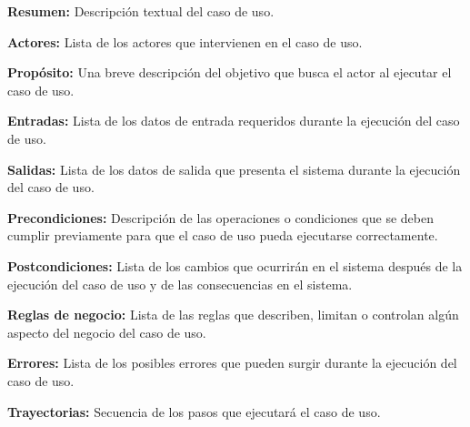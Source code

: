 \documentclass[10pt]{book}
\begin{document}
     \begin{objetivos}
	\item {\bf Resumen:} Descripción textual del caso de uso.
	\item {\bf Actores:} Lista de los actores que intervienen en el caso de uso.
	\item {\bf Propósito:} Una breve descripción del objetivo que busca el actor al ejecutar el caso de uso.
	\item {\bf Entradas:} Lista de los datos de entrada requeridos durante la ejecución del caso de uso.
	\item {\bf Salidas:} Lista de los datos de salida que presenta el sistema durante la ejecución del caso de uso.
	\item {\bf Precondiciones:} Descripción de las operaciones o condiciones que se deben cumplir previamente para que el caso de uso pueda ejecutarse correctamente.
	\item {\bf Postcondiciones:} Lista de los cambios que ocurrirán en el sistema después de la ejecución del caso de uso y de las consecuencias en el sistema.
	\item {\bf Reglas de negocio:} Lista de las reglas que describen, limitan o controlan algún aspecto del negocio del caso de uso.
	\item {\bf Errores:} Lista de los posibles errores que pueden surgir durante la ejecución del caso de uso.
	\item {\bf Trayectorias:} Secuencia de los pasos que ejecutará el caso de uso.
    \end{objetivos}

 
\end{document}
